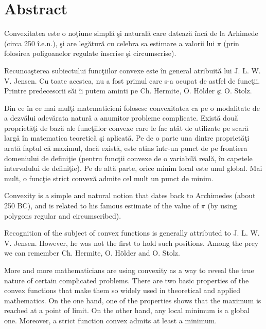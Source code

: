 \documentclass[a4paper,12pt,oneside]{report}
\begin{document}
\maketitle

\tableofcontents
\listoffigures

\newpage
{}


\chapter*{Abstract}

Convexitatea este o no\c{t}iune simpl\u{a} \c{s}i natural\u{a} care dateaz\u{a} \^{i}nc\u{a} de la Arhimede (circa 250 \^{i}.e.n.), \c{s}i are leg\u{a}tur\u{a} cu celebra sa estimare a valorii lui \(\pi\) (prin folosirea poligoanelor regulate \^{i}nscrise \c{s}i circumscrise).

Recunoa\c{s}terea subiectului func\c{t}iilor convexe este \^{i}n general atribuit\u{a} lui J. L. W. V. Jensen. Cu toate acestea, nu a fost primul care s-a ocupat de astfel de func\c{t}ii. Printre predecesorii s\u{a}i \^{i}i putem aminti pe Ch. Hermite, O. Hölder \c{s}i O. Stolz.

Din ce \^{i}n ce mai mul\c{t}i matematicieni folosesc convexitatea ca pe o modalitate de a dezv\u{a}lui adev\u{a}rata natur\u{a} a anumitor probleme complicate. Exist\u{a} dou\u{a} propriet\u{a}\c{t}i de baz\u{a} ale func\c{t}iilor convexe care le fac at\^{a}t de utilizate pe scar\u{a} larg\u{a} \^{i}n matematica teoretic\u{a} \c{s}i aplicat\u{a}. Pe de o parte una dintre propriet\u{a}\c{t}i arat\u{a} faptul c\u{a} maximul, dac\u{a} exist\u{a}, este atins \^{i}ntr-un punct de pe frontiera domeniului de defini\c{t}ie (pentru func\c{t}ii convexe de o variabil\u{a} real\u{a}, \^{i}n capetele intervalului de defini\c{t}ie). Pe de alt\u{a} parte, orice minim local este unul global. Mai mult, o func\c{t}ie strict convex\u{a} admite cel mult un punct de minim.

Convexity is a simple and  natural notion that dates back to Archimedes (about
250 BC), and is related to his famous estimate of the value of \(\pi\)  (by using polygons
regular and circumscribed).

Recognition of the subject of convex functions is generally attributed to J. L. W. V.
Jensen. However, he was not the first to hold such positions. Among the prey we can remember Ch. Hermite, O. Hölder and O. Stolz.

More and more mathematicians are using convexity as a way to
reveal the true nature of certain complicated problems. There are two basic properties
of the convex functions that make them so widely used in theoretical and applied mathematics. On the one hand, one of the properties shows that the maximum is reached at a point
of limit. On the other hand, any local minimum is a global one. Moreover, a strict function
convex admits at least a minimum.
\end{document}
